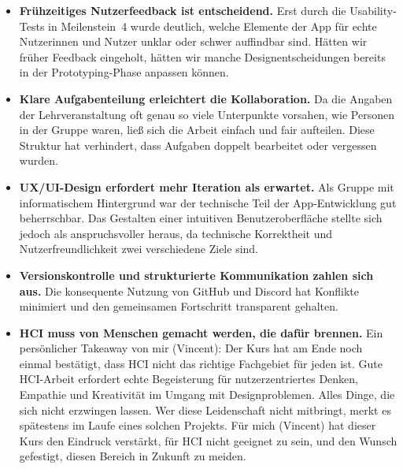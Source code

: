 \begin{itemize}
    \item \textbf{Frühzeitiges Nutzerfeedback ist entscheidend.}
    Erst durch die Usability-Tests in Meilenstein~4 wurde deutlich, welche Elemente der App für echte Nutzerinnen und Nutzer unklar oder schwer auffindbar sind.
    Hätten wir früher Feedback eingeholt, hätten wir manche Designentscheidungen bereits in der Prototyping-Phase anpassen können.

    \item \textbf{Klare Aufgabenteilung erleichtert die Kollaboration.}
    Da die Angaben der Lehrveranstaltung oft genau so viele Unterpunkte vorsahen, wie Personen in der Gruppe waren, ließ sich die Arbeit einfach und fair aufteilen.
    Diese Struktur hat verhindert, dass Aufgaben doppelt bearbeitet oder vergessen wurden.

    \item \textbf{UX/UI-Design erfordert mehr Iteration als erwartet.}
    Als Gruppe mit informatischem Hintergrund war der technische Teil der App-Entwicklung gut beherrschbar.
    Das Gestalten einer intuitiven Benutzeroberfläche stellte sich jedoch als anspruchsvoller heraus, da technische Korrektheit und Nutzerfreundlichkeit zwei verschiedene Ziele sind.

    \item \textbf{Versionskontrolle und strukturierte Kommunikation zahlen sich aus.}
    Die konsequente Nutzung von GitHub und Discord hat Konflikte minimiert und den gemeinsamen Fortschritt transparent gehalten.

    \item \textbf{HCI muss von Menschen gemacht werden, die dafür brennen.}
    Ein persönlicher Takeaway von mir (Vincent): Der Kurs hat am Ende noch einmal bestätigt, dass HCI nicht das richtige Fachgebiet für jeden ist.
    Gute HCI-Arbeit erfordert echte Begeisterung für nutzerzentriertes Denken, Empathie und Kreativität im Umgang mit Designproblemen. Alles Dinge, die sich nicht erzwingen lassen.
    Wer diese Leidenschaft nicht mitbringt, merkt es spätestens im Laufe eines solchen Projekts.
    Für mich (Vincent) hat dieser Kurs den Eindruck verstärkt, für HCI nicht geeignet zu sein, und den Wunsch gefestigt, diesen Bereich in Zukunft zu meiden.
\end{itemize}